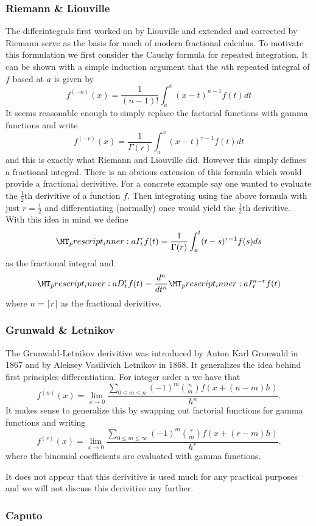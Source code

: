\documentclass{unswmaths}
\begin{document}
\subsubsection{Riemann \& Liouville}
The differintegrals first worked on by Liouville and extended and corrected by Riemann serve as the basis for much of modern
fractional calculus. To motivate this formulation we first consider the Cauchy formula for repeated integration. 
It can be shown with a simple induction argument that the $ n$th repeated integral of $ f $ based at $ a $ is given by
$$
    f^{(-n)}(x) = \frac{1}{(n-1)!} \int_a^x (x-t)^{n-1} f(t) dt
$$
It seems reasonable enough to simply replace the factorial functions with gamma functions and write
$$
    f^{(-r)}(x) = \frac{1}{\Gamma(r)} \int_a^x (x-t)^{r-1} f(t) dt
$$
and this is exactly what Riemann and Liouville did. However this simply defines a fractional integral. There is an obvious
extension of this formula which would provide a fractional derivitive. For a concrete example say one wanted to evaluate
the $ \frac{1}{2}$th derivitive of a function $ f $. Then integrating using the above formula with just $ r = \frac{1}{2} $ and
differentiating (normally) once would yield the $\frac{1}{2}$th derivitive. With this idea in mind we define
$$
    \prescript{}{a}{I}_t^r f(t) = \frac{1}{\Gamma(r)} \int_a^t (t-s)^{r-1}f(s) ds
$$
as the fractional integral and
$$
    \prescript{}{a}{D}_t^r f(t) = \frac{d^n}{dt^n} \prescript{}{a}{I}_t^{n-r} f(t)
$$
where $ n = \lceil r \rceil $ as the fractional derivitive.
\subsubsection{Grunwald \& Letnikov}
The Grunwald-Letnikov derivitive was introduced by Anton Karl Grunwald in 1867 and by Aleksey Vasilivich Letnikov in 1868.
It generalizes the idea behind  first principles differentiation. For integer order n we have that
$$
    f^{(n)}(x) = \lim_{x\longrightarrow0} \frac{\sum_{0\leq m \leq n} (-1)^m \binom{n}{m} f(x + (n-m)h)}{h^n}.
$$
It makes sense to generalize this by swapping out factorial functions for gamma functions and writing
$$
    f^{(r)}(x) = \lim_{x\longrightarrow0} \frac{\sum_{0\leq m \leq \infty} (-1)^m \binom{r}{m} f(x + (r-m)h)}{h^r}.
$$
where the binomial coefficients are evaluated with gamma functions.

It does not appear that this derivitive is used much for any practical purposes and we will not discuss this derivitive any further.
\subsubsection{Caputo}
\end{document}
